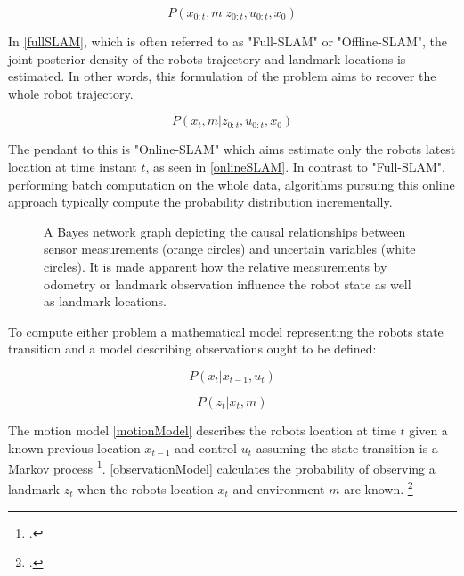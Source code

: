 \begin{equation}\label{fullSLAM}
	P(x_{0:t}, m | z_{0:t}, u_{0:t}, x_{0})
\end{equation}

In \ref{fullSLAM}, which is often referred to as "Full-SLAM" or "Offline-SLAM", the joint posterior density of the robots trajectory and landmark locations is estimated. In other words, this formulation of the problem aims to recover the whole robot trajectory.

\begin{equation}\label{onlineSLAM}
	P(x_{t}, m | z_{0:t}, u_{0:t}, x_{0})
\end{equation}

The pendant to this is "Online-SLAM" which aims estimate only the robots latest location at time instant $ t $, as seen in \ref{onlineSLAM}. In contrast to "Full-SLAM", performing batch computation on the whole data, algorithms pursuing this online approach typically compute the probability distribution incrementally. 

\begin{figure}
	\centering
	
	\caption{
		A Bayes network graph depicting the causal relationships between sensor measurements (orange circles) and uncertain variables (white circles). It is made apparent how the relative measurements by odometry or landmark observation influence the robot state as well as landmark locations. 
	}
	\label{fig:slamGraphical}
\end{figure}

To compute either problem a mathematical model representing the robots state transition and a model describing observations ought to be defined:

\begin{equation}\label{motionModel}
	P(x_{t} | x_{t-1}, u_{t})
\end{equation}

\begin{equation}\label{observationModel}
	P(z_{t} | x_{t}, m)
\end{equation}

The motion model \ref{motionModel} describes the robots location at time $ t $ given a known previous location $ x_{t-1} $ and control $ u_{t} $ assuming the state-transition is a Markov process \footcite{haeneltMarvoModel2006}.
\ref{observationModel} calculates the probability of observing a landmark $ z_{t} $ when the robots location $ x_{t} $ and environment $ m $ are known.
\footcite{durrantSlam2006}

